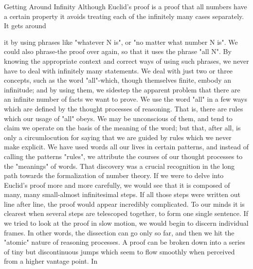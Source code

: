 Getting Around Infinity Although Euclid's proof is a proof that all numbers have a certain property it avoids treating each of the infinitely many cases separately. It gets around 







it by using phrases like "whatever N is", or "no matter what number N is". We could also phrase-the proof over again, so that it uses the phrase "all N". By knowing the appropriate context and correct ways of using such phrases, we never have to deal with infinitely many statements. We deal with just two or three concepts, such as the word "all"-which, though themselves finite, embody an infinitude; and by using them, we sidestep the apparent problem that there are an infinite number of facts we want to prove. We use the word "all" in a few ways which are defined by the thought processes of reasoning. That is, there are rules which our usage of "all" obeys. We may be unconscious of them, and tend to claim we operate on the basis of the meaning of the word; but that, after all, is only a circumlocution for saying that we are guided by rules which we never make explicit. We have used words all our lives in certain patterns, and instead of calling the patterns "rules", we attribute the courses of our thought processes to the "meanings" of words. That discovery was a crucial recognition in the long path towards the formalization of number theory. If we were to delve into Euclid's proof more and more carefully, we would see that it is composed of many, many small-almost infinitesimal steps. If all those steps were written out line after line, the proof would appear incredibly complicated. To our minds it is clearest when several steps are telescoped together, to form one single sentence. If we tried to look at the proof in slow motion, we would begin to discern individual frames. In other words, the dissection can go only so far, and then we hit the "atomic" nature of reasoning processes. A proof can be broken down into a series of tiny but discontinuous jumps which seem to flow smoothly when perceived from a higher vantage point. In 
